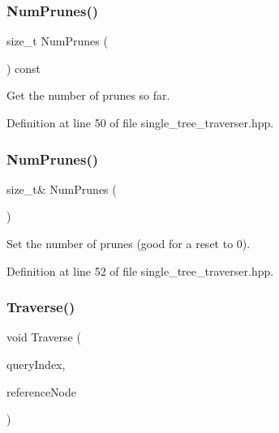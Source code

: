 \subsubsection{Num\+Prunes()\hspace{0.1cm}{\footnotesize\ttfamily [1/2]}}
{\footnotesize\ttfamily size\+\_\+t Num\+Prunes (\begin{DoxyParamCaption}{ }\end{DoxyParamCaption}) const\hspace{0.3cm}{\ttfamily [inline]}}



Get the number of prunes so far. 



Definition at line 50 of file single\+\_\+tree\+\_\+traverser.\+hpp.

\mbox{\label{classmlpack_1_1tree_1_1CoverTree_1_1SingleTreeTraverser_adf887190e9d9024ff244503e4aaf0732}} 
\subsubsection{Num\+Prunes()\hspace{0.1cm}{\footnotesize\ttfamily [2/2]}}
{\footnotesize\ttfamily size\+\_\+t\& Num\+Prunes (\begin{DoxyParamCaption}{ }\end{DoxyParamCaption})\hspace{0.3cm}{\ttfamily [inline]}}



Set the number of prunes (good for a reset to 0). 



Definition at line 52 of file single\+\_\+tree\+\_\+traverser.\+hpp.

\mbox{\label{classmlpack_1_1tree_1_1CoverTree_1_1SingleTreeTraverser_a442f638cd873ced3979b162ebceea25b}} 
\subsubsection{Traverse()}
{\footnotesize\ttfamily void Traverse (\begin{DoxyParamCaption}\item[{const size\+\_\+t}]{query\+Index,  }\item[{\textbf{ Cover\+Tree} \&}]{reference\+Node }\end{DoxyParamCaption})}



